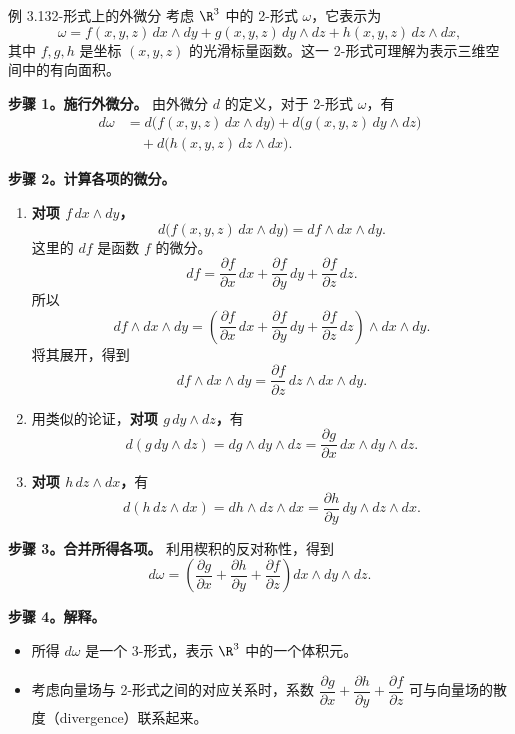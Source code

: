 \begin{statement}{例 3.13}{2-形式上的外微分}
考虑 $\R^3$ 中的 2-形式 $\omega$，它表示为
\[
  \omega=f(x,y,z)\,dx\wedge dy+g(x,y,z)\,dy\wedge dz
      +h(x,y,z)\,dz\wedge dx,
\]
其中 $f,g,h$ 是坐标 $(x,y,z)$ 的光滑标量函数。这一 2-形式可理解为表示三维空间中的有向面积。

\textbf{步骤 1。施行外微分。}
由外微分 $d$ 的定义，对于 2-形式 $\omega$，有
\begin{align*}
  d\omega &= d\bigl(f(x,y,z)\,dx\wedge dy\bigr)+d\bigl(g(x,y,z)\,dy\wedge dz\bigr)\\
    &\quad+d\bigl(h(x,y,z)\,dz\wedge dx\bigr).
\end{align*}

\textbf{步骤 2。计算各项的微分。}
\begin{enumerate}
\item \textbf{对项 $f\,dx\wedge dy$，}
\[
  d\bigl(f(x,y,z)\,dx\wedge dy\bigr)=df\wedge dx\wedge dy.
\]
这里的 $df$ 是函数 $f$ 的微分。
\[
  df=\frac{\partial f}{\partial x}\,dx+\frac{\partial f}{\partial y}\,dy
    +\frac{\partial f}{\partial z}\,dz.
\]
所以
\[
  df\wedge dx\wedge dy=\left(\frac{\partial f}{\partial x}\,dx
     +\frac{\partial f}{\partial y}\,dy+\frac{\partial f}{\partial z}\,dz\right)
     \wedge dx\wedge dy.
\]
将其展开，得到
\[
  df\wedge dx\wedge dy=\frac{\partial f}{\partial z}\,dz\wedge dx\wedge dy.
\]
\item 用类似的论证，\textbf{对项 $g\,dy\wedge dz$，}有
\[
  d(g\,dy\wedge dz)=dg\wedge dy\wedge dz
    =\frac{\partial g}{\partial x}\,dx\wedge dy\wedge dz.
\]
\item \textbf{对项 $h\,dz\wedge dx$，}有
\[
  d(h\,dz\wedge dx)=dh\wedge dz\wedge dx
    =\frac{\partial h}{\partial y}\,dy\wedge dz\wedge dx.
\]
\end{enumerate}

\textbf{步骤 3。合并所得各项。}
利用楔积的反对称性，得到
\[
  d\omega=\left(\frac{\partial g}{\partial x}
    +\frac{\partial h}{\partial y}+\frac{\partial f}{\partial z}\right)
    dx\wedge dy\wedge dz.
\]

\textbf{步骤 4。解释。}
\begin{itemize}
\item 所得 $d\omega$ 是一个 3-形式，表示 $\R^3$ 中的一个体积元。
\item 考虑向量场与 2-形式之间的对应关系时，系数 $\dfrac{\partial g}{\partial x}+\dfrac{\partial h}{\partial y}+\dfrac{\partial f}{\partial z}$ 可与向量场的散度（divergence）联系起来。
\end{itemize}
\end{statement}


